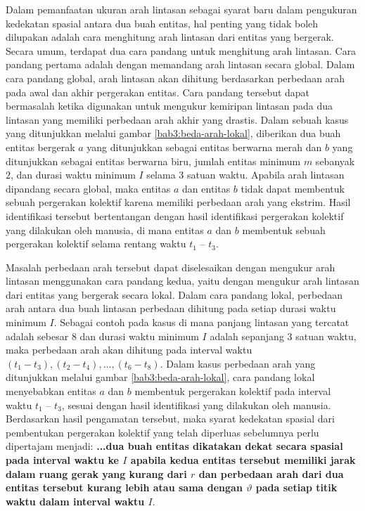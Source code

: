 Dalam pemanfaatan ukuran arah lintasan sebagai syarat baru dalam pengukuran kedekatan spasial antara dua buah entitas, hal penting yang tidak boleh dilupakan adalah cara menghitung arah lintasan dari entitas yang bergerak. Secara umum, terdapat dua cara pandang untuk menghitung arah lintasan. Cara pandang pertama adalah dengan memandang arah lintasan secara global. Dalam cara pandang global, arah lintasan akan dihitung berdasarkan perbedaan arah pada awal dan akhir pergerakan entitas. Cara pandang tersebut dapat bermasalah ketika digunakan untuk mengukur kemiripan lintasan pada dua lintasan yang memiliki perbedaan arah akhir yang drastis. Dalam sebuah kasus yang ditunjukkan melalui gambar \ref{bab3:beda-arah-lokal}, diberikan dua buah entitas bergerak $a$ yang ditunjukkan sebagai entitas berwarna merah dan $b$ yang ditunjukkan sebagai entitas berwarna biru, jumlah entitas minimum $m$ sebanyak $2$, dan durasi waktu minimum $I$ selama $3$ satuan waktu. Apabila arah lintasan dipandang secara global, maka entitas $a$ dan entitas $b$ tidak dapat membentuk sebuah pergerakan kolektif karena memiliki perbedaan arah yang ekstrim. Hasil identifikasi tersebut bertentangan dengan hasil identifikasi pergerakan kolektif yang dilakukan oleh manusia, di mana entitas $a$ dan $b$ membentuk sebuah pergerakan kolektif selama rentang waktu $t_1$ -- $t_3$.

Masalah perbedaan arah tersebut dapat diselesaikan dengan mengukur arah lintasan menggunakan cara pandang kedua, yaitu dengan mengukur arah lintasan dari entitas yang bergerak secara lokal. Dalam cara pandang lokal, perbedaan arah antara dua buah lintasan perbedaan dihitung pada setiap durasi waktu minimum $I$. Sebagai contoh pada kasus di mana panjang lintasan yang tercatat adalah sebesar $8$ dan durasi waktu minimum $I$ adalah sepanjang $3$ satuan waktu, maka perbedaan arah akan dihitung pada interval waktu $(t_1 - t_3), (t_2 - t_4), \ldots, (t_6 - t_8)$. Dalam kasus perbedaan arah yang ditunjukkan melalui gambar \ref{bab3:beda-arah-lokal}, cara pandang lokal menyebabkan entitas $a$ dan $b$ membentuk pergerakan kolektif pada interval waktu $t_1$ -- $t_3$, sesuai dengan hasil identifikasi yang dilakukan oleh manusia. Berdasarkan hasil pengamatan tersebut, maka syarat kedekatan spasial dari pembentukan pergerakan kolektif yang telah diperluas sebelumnya perlu dipertajam menjadi: \textbf{...dua buah entitas dikatakan dekat secara spasial pada interval waktu ke $I$ apabila kedua entitas tersebut memiliki jarak dalam ruang gerak yang kurang dari $r$ dan perbedaan arah dari dua entitas tersebut kurang lebih atau sama dengan $\vartheta$ pada setiap titik waktu dalam interval waktu $I$}.

